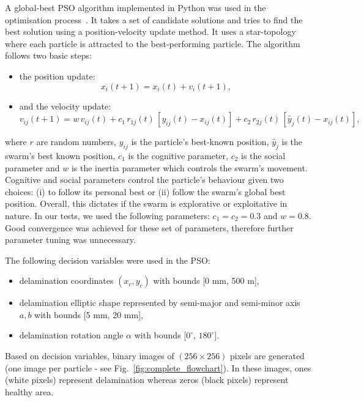 \documentclass[sn-mathphys-num]{sn-jnl}%
\begin{document}
	A global-best PSO algorithm implemented in Python was used in the 
	optimisation process~\cite{MirandaLesterJames}.
	It takes a set of candidate solutions and tries to find the best solution 
	using a position-velocity update method. 
	It uses a star-topology where each particle is attracted to the 
	best-performing particle.
	The algorithm follows two basic steps:
	\begin{itemize}
		\item the position update:
		\begin{equation}
			x_i(t+1) = x_i(t) + v_i(t+1),\label{eq:position_update}
		\end{equation}
		\item and the velocity update:
		\begin{equation}
			v_{ij}(t+1) = w\, v_{ij}(t) + c_1\, r_{1j}(t) \,[y_{ij}(t) - 
			x_{ij}(t)] + c_2\, r_{2j}(t)\,[\hat{y}_j(t) - 
			x_{ij}(t)],\label{eq:velocity_update}
		\end{equation}
	\end{itemize}
	where $r$ are random numbers, $y_{ij}$ is the particle's best-known 
	position, $\hat{y}_j$ is the swarm's best known position, $c_1$ is the 
	cognitive parameter, $c_2$ is the social parameter and $w$ is the inertia 
	parameter which controls the swarm's movement.
	Cognitive and social parameters control the particle's behaviour given two 
	choices: (i) to follow its personal best or (ii) follow the swarm’s global 
	best position.
	Overall, this dictates if the swarm is explorative or exploitative in 
	nature. 
	In our tests, we used the following parameters: $c_1 = c_2 = 0.3$ and 
	$w=0.8$.
	Good convergence was achieved for these set of parameters, therefore 
	further parameter tuning was unnecessary.
	
	The following decision variables were used in the PSO:
	\begin{itemize}
		\item delamination coordinates $(x_c, y_c)$ with bounds [0 mm, 500 m],
		\item delamination elliptic shape represented by semi-major and 
		semi-minor axis $a, b$ with bounds [5 mm, 20 mm],
		\item delamination rotation angle $\alpha$ with bounds [$0^\circ$, 
		$180^\circ$].
	\end{itemize}
	
	Based on decision variables, binary images of $(256\times256)$ pixels are 
	generated (one image per particle - see Fig.~\ref{fig:complete_flowchart}).
	In these images, ones (white pixels) represent delamination whereas zeros 
	(black pixels) represent healthy area.
	
\end{document}
